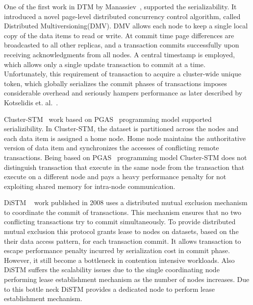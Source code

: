 \documentclass[12pt,english]{report}
\begin{document}
One of the first work in DTM by Manassiev~\cite{Manassiev:2006:EDV:1122971.1123002}, supported the serializability. It introduced a novel page-level distributed concurrency control algorithm, called Distributed Multiversioning(DMV). DMV allows each node to keep a single local copy of the data items to read or write. At commit time page differences are broadcasted to all other replicas, and a transaction commits successfully upon receiving acknowledgments from all nodes. A central timestamp is employed, which allows only a single update transaction to commit at a time. Unfortunately, this requirement of transaction to acquire a cluster-wide unique token, which globally serializes the commit phases of transactions imposes considerable overhead and seriously hampers performance as later described by Kotselidis et. al.~\cite{Kotselidis08distm:a}.

Cluster-STM~\cite{Bocchino:2008:STM:1345206.1345242} work based on PGAS~\cite{PGAS:Programmin:Model} programming model supported serializibility. In Cluster-STM, the dataset is partitioned across the nodes and each data item is assigned a home node. Home node maintains the authoritative version of data item and synchronizes the accesses of conflicting remote transactions. Being based on PGAS~\cite{PGAS:Programmin:Model} programming model Cluster-STM does not distinguish transaction that execute in the same node from the transaction that execute on a different node and pays a heavy performance penalty for not exploiting shared memory for intra-node communication.

DiSTM ~\cite{Kotselidis08distm:a} work published in 2008 uses a distributed mutual exclusion mechanism to coordinate the commit of transactions. This mechanism ensures that no two conflicting transactions try to commit simultaneously. To provide distributed mutual exclusion this protocol grants lease to nodes on datasets, based on the their data access pattern, for each transaction commit. It allows transaction to escape performance penalty incurred by serialization cost in commit phase. However, it still become a bottleneck in contention intensive workloads. Also DiSTM suffers the scalability issues due to the single coordinating node performing lease establishment mechanism as the number of nodes increases. Due to this bottle neck DiSTM provides a dedicated node to perform lease establishment mechanism.
\end{document}
